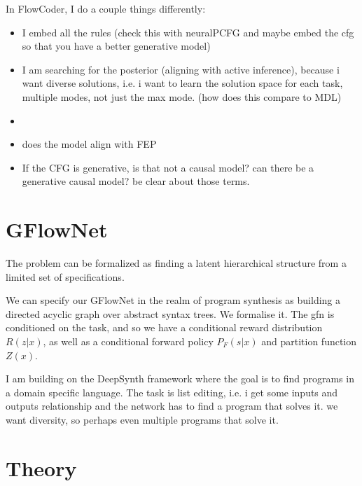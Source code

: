 In FlowCoder, I do a couple things differently:

\begin{itemize}
    \item I embed all the rules (check this with neuralPCFG and maybe embed the cfg so that you have a better generative model)
    \item I am searching for the posterior (aligning with active inference), because i want diverse solutions, i.e. i want to learn the solution space for each task, multiple modes, not just the max mode. (how does this compare to MDL)
    \item 
\end{itemize}

\begin{itemize}
    \item does the model align with FEP
    \item If the CFG is generative, is that not a causal model? can there be a generative causal model? be clear about those terms. 
\end{itemize}


\section{GFlowNet}
The problem can be formalized as finding a latent hierarchical structure from a limited set of specifications.

We can specify our GFlowNet in the realm of program synthesis as building a directed acyclic graph over abstract syntax trees.
We formalise it. 
The gfn is conditioned on the task, and so we have a conditional reward distribution $R(z|x)$, as well as a conditional forward policy $P_F(s|x)$ and partition function $Z(x)$.

I am building on the DeepSynth framework where the goal is to find programs in a domain specific language. 
The task is list editing, i.e. i get some inputs and outputs relationship and the network has to find a program that solves it. 
we want diversity, so perhaps even multiple programs that solve it.

\section{Theory}

